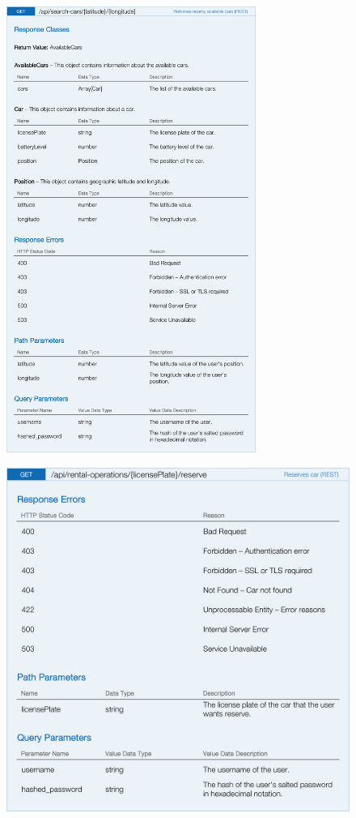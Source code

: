 \begin{figure}[H]
	\noindent
    	\centering
    	\includegraphics[height=550px, keepaspectratio]{apitables/APISearchCars.png}
    	\label{fig:api-search-cars}
\end{figure}

\begin{figure}[H]
	\noindent
    	\centering
    	\includegraphics{apitables/APIReservation.png}
    	\label{fig:api-reservation}
\end{figure}

